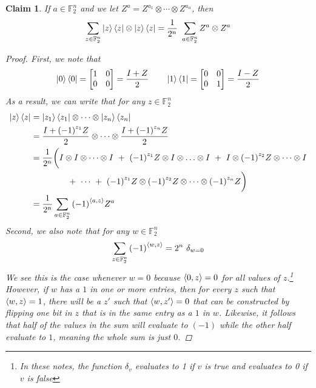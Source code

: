 \documentclass[11pt]{article}
\newtheorem{claim}[thm]{Claim}
\theoremstyle{definition}
\theoremstyle{plain}
\begin{document}
\begin{claim}
If $a \in \mathbb{F}_2^n$ and we let $Z^a = Z^{a_1} \otimes \cdots \otimes Z^{a_n}$, then 
\begin{equation}\label{prelim_2}
  \sum\limits_{z \in \mathbb{F}_2^n} \ket{z} \bra{z} \otimes \ket{z} \bra{z}
  = \frac{1}{2^n} \ \sum\limits_{a \in \mathbb{F}_2^n} Z^a \otimes Z^a
\end{equation}
\begin{proof}
First, we note that
\begin{equation}
  \ket{0} \bra{0} =
  \begin{bmatrix}
    1 & 0 \\
    0 & 0 \\ 
  \end{bmatrix} = \frac{I + Z}{2} \qquad
  \ket{1} \bra{1} =
  \begin{bmatrix}
    0 & 0 \\
    0 & 1 \\ 
  \end{bmatrix} = \frac{I - Z}{2} 
\end{equation}
As a result, we can write that for any $z \in \mathbb{F}_2^n$
\begin{align}
  \ket{z} \bra{z} &= \ket{z_1} \bra{z_1} \otimes \cdots \otimes 
                    \ket{z_n} \bra{z_n} \\
                  &= \frac{I + {(-1)}^{z_1} Z}{2} \otimes \cdots \otimes
                    \frac{I + {(-1)}^{z_n}Z}{2} \\
                  &= \frac{1}{2^n} \biggl(I \otimes I \otimes \cdots \otimes I
                    \ + \ {(-1)}^{z_1} Z \otimes I \otimes \ldots \otimes I
                    \ + \ I \otimes {(-1)}^{z_2} Z \otimes \cdots \otimes I
                    \nonumber \\
                  & \qquad \qquad
                    \ + \ \cdots \ + \
                    {(-1)}^{z_1} Z \otimes {(-1)}^{z_2} Z \otimes \cdots
                    \otimes {(-1)}^{z_n} Z \biggr) \\
                  &= \frac{1}{2^n} \sum\limits_{a \in \mathbb{F}_2^n}
                    {(-1)}^{\braket{a, z}} Z^a \label{prelim_4}
\end{align}
Second, we also note that for any $w \in \mathbb{F}_2^n$
\begin{equation}\label{prelim_5}
  \sum\limits_{z \in \mathbb{F}_2^n} {(-1)}^{\braket{w, z}} = 2^n \ \delta_{w = 0} 
\end{equation}
We see this is the case whenever $w = 0$ because $\braket{0, z} = 0$ for all values of $z$.\footnote{In these notes, the function $\delta_{v}$ evaluates to 1 if $v$ is true and evaluates to 0 if $v$ is false} However, if $w$ has a $1$ in one or more entries, then for every $z$ such that $\braket{w, z} = 1$, there will be a $z'$ such that $\braket{w, z'} = 0$ that can be constructed by flipping one bit in $z$ that is in the same entry as a $1$ in $w$. Likewise, it follows that half of the values in the sum will evaluate to $(-1)$ while the other half evaluate to $1$, meaning the whole sum is just $0$.


\end{proof}
\end{claim}
\end{document}
